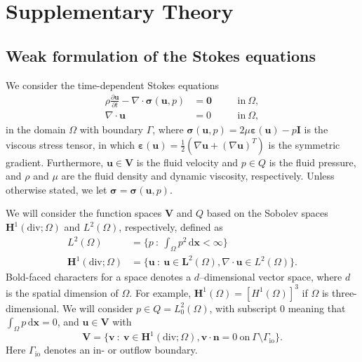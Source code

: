 \documentclass[fleqn]{wlscirep}
\newcommand{\pdifft}[1]{\frac{\partial  #1}{\partial t}}
\newcommand{\intO}[1]{\int_{\Omega}#1 \, \mathrm d\bm{x}}
\newcommand{\nn}{\mathbf{n}}
\newcommand{\uu}{\mathbf{u}}
\newcommand{\vv}{\mathbf{v}}
\newcommand{\VV}{\mathbf{V}}
\newcommand{\bsig}{\bm{\sigma}}
\newcommand{\beps}{\bm{\varepsilon}}
\begin{document}
\appendix
\section{Supplementary Theory}
\subsection{Weak formulation of the Stokes equations}\label{subsec:appendixA1}
We consider the time-dependent Stokes equations
\begin{subequations}
\begin{alignat}{2}
   \rho\pdifft{\uu} - \nabla \cdot \bsig(\uu, p) &= \mathbf{0} \quad &&\mathrm{in} \ \Omega, \label{eq:BDM_stokes_mom}\\
  \nabla \cdot \uu &= 0 \quad &&\mathrm{in} \ \Omega, \label{eq:BDM_stokes_div} 
\end{alignat}
\label{eq:appendix_stokes_eqs}%
\end{subequations}%
in the domain $\Omega$ with boundary $\Gamma$, where
$\bsig(\uu, p) = 2\mu\beps(\uu) - p\mathbf{I}$ is the viscous
stress tensor, in which $\beps(\uu) = \frac{1}{2}(\nabla\uu + (\nabla\uu)^T)$
is the symmetric gradient. Furthermore, $\uu\in\VV$ is the fluid velocity
and $p\in Q$ is the fluid pressure, and $\rho$ and $\mu$ are the fluid density
and dynamic viscosity, respectively. Unless otherwise stated, we let $\bsig = \bsig(\uu, p)$. 

We will consider the function spaces $\VV$ and $Q$ based on the
Sobolev spaces $\mathbf{H}^1(\mathrm{div}; \Omega)$ and $L^2(\Omega)$,
respectively, defined as 
\begin{align*}
    L^2(\Omega) &= \bigg\{p \ : \ \intO{p^2} < \infty\bigg\} \\
    \mathbf{H}^1(\mathrm{div}; \Omega) &= \bigg\{\uu \ : \ \uu\in\mathbf{L}^2(\Omega), \nabla\cdot\uu\in L^2(\Omega)\bigg\}.
\end{align*}
Bold-faced characters for a space denotes a $d$--dimensional vector space,
where $d$ is the spatial dimension of $\Omega$. For example,
$\mathbf{H}^1(\Omega) = [H^1(\Omega)]^3$ if $\Omega$ is three-dimensional.
We will consider $p\in Q=L^2_0(\Omega)$, with subscript 0 meaning
that $\intO{p} = 0$, and $\uu\in\VV$ with
\begin{equation*}
    \VV =  \bigg\{\vv \ : \ \vv\in\mathbf{H}^1(\mathrm{div}; \Omega), \vv\cdot\nn=0 \ \mathrm{on} \ \Gamma\setminus\Gamma_{\mathrm{io}}\bigg\}.
\end{equation*}
Here $\Gamma_{\mathrm{io}}$ denotes an in- or outflow boundary. 
\end{document}
